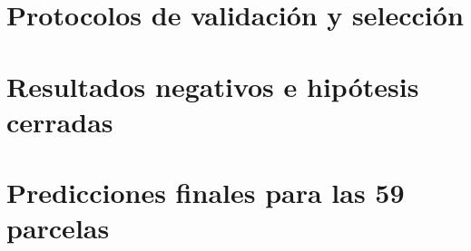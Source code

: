 \documentclass[11pt,oneside]{report}
\begin{document}
\chapter{Protocolos de validación y selección}
\label{app:validation}


\chapter{Resultados negativos e hipótesis cerradas}
\label{app:negative}


\chapter{Predicciones finales para las 59 parcelas}
\label{app:predictions}


\clearpage
\printbibliography[heading=bibintoc,title={Referencias}]
\end{document}
